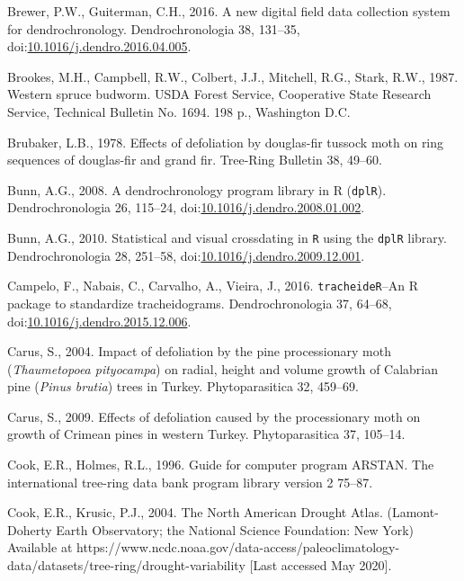 \documentclass[review]{elsarticle} %
\begin{document}
\leavevmode\hypertarget{ref-Brewer2016}{}%
Brewer, P.W., Guiterman, C.H., 2016. A new digital field data collection system for dendrochronology. Dendrochronologia 38, 131--35, doi:\href{https://doi.org/10.1016/j.dendro.2016.04.005}{10.1016/j.dendro.2016.04.005}.

\leavevmode\hypertarget{ref-Brookes1987}{}%
Brookes, M.H., Campbell, R.W., Colbert, J.J., Mitchell, R.G., Stark, R.W., 1987. Western spruce budworm. USDA Forest Service, Cooperative State Research Service, Technical Bulletin No. 1694. 198 p., Washington D.C.

\leavevmode\hypertarget{ref-Brubaker1978}{}%
Brubaker, L.B., 1978. Effects of defoliation by douglas-fir tussock moth on ring sequences of douglas-fir and grand fir. Tree-Ring Bulletin 38, 49--60.

\leavevmode\hypertarget{ref-Bunn2008}{}%
Bunn, A.G., 2008. A dendrochronology program library in R (\texttt{dplR}). Dendrochronologia 26, 115--24, doi:\href{https://doi.org/10.1016/j.dendro.2008.01.002}{10.1016/j.dendro.2008.01.002}.

\leavevmode\hypertarget{ref-Bunn2010}{}%
Bunn, A.G., 2010. Statistical and visual crossdating in \texttt{R} using the \texttt{dplR} library. Dendrochronologia 28, 251--58, doi:\href{https://doi.org/10.1016/j.dendro.2009.12.001}{10.1016/j.dendro.2009.12.001}.

\leavevmode\hypertarget{ref-Campelo2016}{}%
Campelo, F., Nabais, C., Carvalho, A., Vieira, J., 2016. \texttt{tracheideR}--An R package to standardize tracheidograms. Dendrochronologia 37, 64--68, doi:\href{https://doi.org/10.1016/j.dendro.2015.12.006}{10.1016/j.dendro.2015.12.006}.

\leavevmode\hypertarget{ref-Carus2004}{}%
Carus, S., 2004. Impact of defoliation by the pine processionary moth (\emph{Thaumetopoea pityocampa}) on radial, height and volume growth of Calabrian pine (\emph{Pinus brutia}) trees in Turkey. Phytoparasitica 32, 459--69.

\leavevmode\hypertarget{ref-Carus2009}{}%
Carus, S., 2009. Effects of defoliation caused by the processionary moth on growth of Crimean pines in western Turkey. Phytoparasitica 37, 105--14.

\leavevmode\hypertarget{ref-arstan}{}%
Cook, E.R., Holmes, R.L., 1996. Guide for computer program ARSTAN. The international tree-ring data bank program library version 2 75--87.

\leavevmode\hypertarget{ref-Cook2004}{}%
Cook, E.R., Krusic, P.J., 2004. The North American Drought Atlas. (Lamont- Doherty Earth Observatory; the National Science Foundation: New York) Available at https://www.ncdc.noaa.gov/data-access/paleoclimatology-data/datasets/tree-ring/drought-variability {[}Last accessed May 2020{]}.
\end{document}
